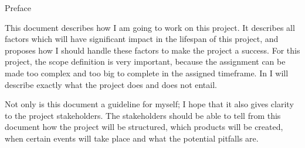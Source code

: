 \documentclass{matthijs}
\begin{document}

	\begin{titelpagina}


	\end{titelpagina}

	\begin{hoofdstuk}{Preface}

		This document describes how I am going to work on this project.
		It describes all factors which will have significant impact in the lifespan of this project, and proposes how I should handle these factors to make the project a success.
		For this project, the scope definition is very important, because the assignment can be made too complex and too big to complete in the assigned timeframe. In  I will describe exactly what the project does and does not entail.
		
		Not only is this document a guideline for myself; I hope that it also gives clarity to the project stakeholders.
		The stakeholders should be able to tell from this document how the project will be structured, which products will be created, when certain events will take place and what the potential pitfalls are.
		
	\end{hoofdstuk}
	
\end{document}
